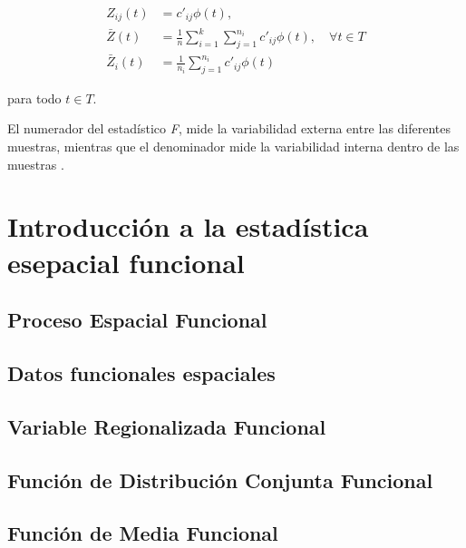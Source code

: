 \documentclass[
]{book}
\begin{document}
\begin{align*}
    Z_{ij}(t)&=c'_{ij}\phi(t),\\
    \bar{Z}(t)&=\frac{1}{n}\sum_{i=1}^k\sum_{j=1}^{n_i} c'_{ij}\phi(t), \quad \forall t\in T\\
    \bar{Z}_i(t)&=\frac{1}{n_i}\sum_{j=1}^{n_i}c'_{ij}\phi(t)
\end{align*}

para todo \(t\in T\).

El numerador del estadístico \textit{F}, mide la variabilidad externa entre las diferentes muestras, mientras que el denominador mide la variabilidad interna dentro de las muestras \citep{cuevas}.

\hypertarget{introducciuxf3n-a-la-estaduxedstica-esepacial-funcional}{%
\chapter{Introducción a la estadística esepacial funcional}\label{introducciuxf3n-a-la-estaduxedstica-esepacial-funcional}}

\hypertarget{proceso-espacial-funcional}{%
\section{Proceso Espacial Funcional}\label{proceso-espacial-funcional}}

\hypertarget{datos-funcionales-espaciales}{%
\section{Datos funcionales espaciales}\label{datos-funcionales-espaciales}}

\hypertarget{variable-regionalizada-funcional}{%
\section{Variable Regionalizada Funcional}\label{variable-regionalizada-funcional}}

\hypertarget{funciuxf3n-de-distribuciuxf3n-conjunta-funcional}{%
\section{Función de Distribución Conjunta Funcional}\label{funciuxf3n-de-distribuciuxf3n-conjunta-funcional}}

\hypertarget{funciuxf3n-de-media-funcional}{%
\section{Función de Media Funcional}\label{funciuxf3n-de-media-funcional}}
\end{document}
